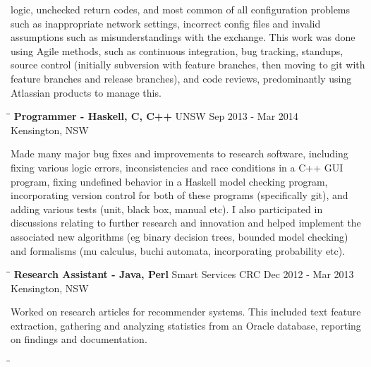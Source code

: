 \documentclass{res}
\begin{document}
\begin{resume}
    logic, unchecked return codes, and most common of all configuration
    problems such as inappropriate network settings, incorrect config files and
    invalid assumptions such as misunderstandings with the exchange. This work
    was done using Agile methods, such as continuous integration, bug tracking,
    standups, source control (initially subversion with feature branches, then
    moving to git with feature branches and release branches), and code
    reviews, predominantly using Atlassian products to manage this.
   \begin{tabbing}
   \hspace{2.3in}\= \hspace{2.6in}\= \kill %
    {\bf Programmer - Haskell, C, C++} \>UNSW \>Sep 2013 - Mar 2014\\
                                       \>Kensington, NSW
   \end{tabbing}\vspace{-20pt}      %
    Made many major bug fixes and improvements to research software, including
    fixing various logic errors, inconsistencies and race conditions in a C++
    GUI program, fixing undefined behavior in a Haskell model checking program,
    incorporating version control for both of these programs (specifically
    git), and adding various tests (unit, black box, manual etc). I also
    participated in discussions relating to further research and innovation and
    helped implement the associated new algorithms (eg binary decision trees,
    bounded model checking) and formalisms (mu calculus, buchi automata,
    incorporating probability etc).
   \begin{tabbing}
   \hspace{2.3in}\= \hspace{2.6in}\= \kill %
    {\bf Research Assistant - Java, Perl} \>Smart Services CRC \>Dec 2012 - Mar 2013\\
                                          \>Kensington, NSW
   \end{tabbing}\vspace{-20pt}      %
    Worked on research articles for recommender systems. This included text
    feature extraction, gathering and analyzing statistics from an Oracle
    database, reporting on findings and documentation.
   \begin{tabbing}
   \hspace{2.3in}\= \hspace{2.6in}\= \kill %

\end{tabbing}
\end{resume}
\end{document}
